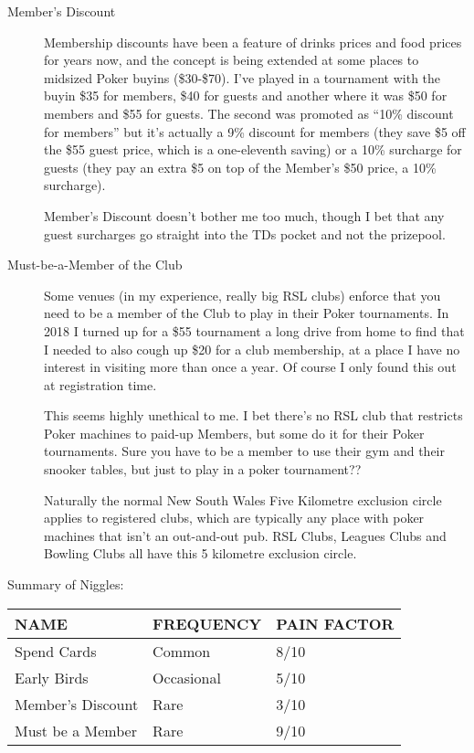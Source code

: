 \begin{description}
\item[Member's Discount] Membership discounts have been a feature
of drinks prices and food prices for years now, and the concept
is being extended at some places to midsized Poker buyins
(\$30-\$70). I've played in a tournament with the buyin
\$35 for members, \$40 for guests and another where it was \$50
for members and \$55 for guests. The second was promoted as ``10\%
discount for members'' but it's actually a 9\% discount for members
(they save \$5 off the \$55 guest price, which is a one-eleventh saving)
or a 10\% surcharge for guests (they pay an extra \$5 on top of the
Member's \$50 price, a 10\% surcharge).

Member's Discount doesn't bother me too much, though I bet that
any guest surcharges go straight into the TDs pocket and not the prizepool.

\item[Must-be-a-Member of the Club] Some venues (in my experience,
really big RSL clubs) enforce that you need to be a member of the Club
to play in their Poker tournaments. In 2018 I turned up for a \$55
tournament a long drive from home to find that I needed to also cough
up \$20 for a club membership, at a place I have no interest in visiting
more than once a year. Of course I only found this out at registration
time.

This seems highly unethical to me. I bet there's no RSL club that
restricts Poker machines to paid-up Members, but some do it for
their Poker tournaments. Sure you have to be a member to use
their gym and their snooker tables, but just to play
in a poker tournament??

Naturally the normal New South Wales Five Kilometre
exclusion circle applies to registered clubs, which are
typically any place with poker machines that isn't an out-and-out pub.
RSL Clubs, Leagues Clubs and Bowling Clubs all have this 5 kilometre
exclusion circle.

\end{description}

Summary of Niggles:

\begin{tabular}{|l|l|l|} \hline
NAME    &  FREQUENCY  & PAIN FACTOR\\ \hline
Spend Cards & Common  & 8/10\\ \hline
Early Birds & Occasional & 5/10\\ \hline
Member's Discount & Rare  & 3/10\\ \hline
Must be a Member & Rare  & 9/10\\ \hline
\end{tabular}


